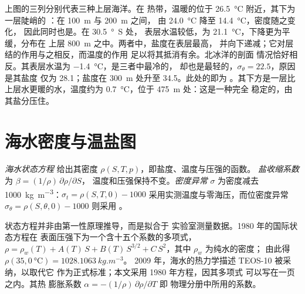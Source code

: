 上图的三列分别代表三种上层海洋。在
热带，温暖的位于 \qty{26.5}{\celsius} 附近，其下为一层陡峭的
：在 \qty{100}{m} 与 \qty{200}{m} 之间，
由 \qty{24.0}{\celsius} 降至 \qty{14.4}{\celsius}，密度随之变化，
因此同时也是。在 \qty{30.5}{\degree S} 处，
表层水温较低，为 \qty{21.1}{\celsius}，下降更为平缓，分布在
上层 \qty{800}{m} 之中。两者中，盐度在表层最高，
并向下递减；它对层结的作用与之相反，而温度的作用
足以将其抵消有余。北冰洋的剖面
情况恰好相反。其表层水温为 \qty{-1.4}{\celsius}，是三者中最冷的，
却也是最轻的，$\sigma_\theta = 22.5$，原因是其盐度
仅为 \num{28.1}；盐度在 \qty{300}{m} 处升至 \num{34.5}。此处的即为
。其下方是一层比上层水更暖的水，温度约为
\qty{0.7}{\celsius}，位于 \qty{475}{m} 处：这是一种完全
稳定的，由其盐分压住。

\section{海水密度与温盐图}\label{sec:b1:fluid-envelopes-structure:ts}

\begin{definition}\label{def:b1:fluid-envelopes-structure:eos}
\emph{海水状态方程}
给出其密度 $\rho(S, T, p)$，即盐度、温度与压强的函数。
\emph{盐收缩系数}
为 $\beta = (1/\rho)\,\partial\rho/\partial S$，
温度和压强保持不变。\emph{密度异常}
$\sigma$ 为密度减去 \qty{1000}{kg.m^{-3}}：$\sigma_t = \rho(S, T, 0) -
1000$ 采用实测温度与零海压，而位密度异常
$\sigma_\theta = \rho(S, \theta, 0) - 1000$ 则采用
。
\end{definition}

状态方程并非由第一性原理推导，而是拟合于
实验室测量数据。1980 年的国际状态方程在
表面压强下为一个含十五个系数的多项式，$\rho = \rho_w(T) +
A(T)\,S + B(T)\,S^{3/2} + C\,S^2$，其中 $\rho_w$ 为纯水的密度；
由此得 $\rho(35, \qty{0}{\celsius}) = \qty{1028.1063}{kg.m^{-3}}$。
2009 年，海水的热力学描述 TEOS-10 被采纳，以取代它
作为正式标准；本文采用 1980 年方程，因其多项式
可以写在一页之内。其热
膨胀系数 $\alpha = -(1/\rho)\,\partial\rho/\partial T$ 即
物理分册中所用的系数。

